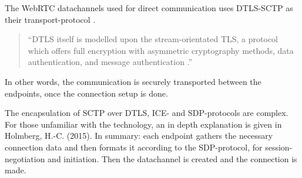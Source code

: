     The WebRTC datachannels used for direct communication uses DTLS-SCTP as their transport-protocol \cite{ar_webrtc_dc}.
    \begin{quotation}
        \enquote{DTLS itself is modelled upon the stream-orientated TLS, a protocol which offers full encryption with asymmetric cryptography methods, data authentication, and message authentication \cite{StudyWebRTCSecurity}.}
    \end{quotation}
    In other words, the communication is securely transported between the endpoints, once the connection setup is done.

    The encapsulation of SCTP over DTLS, ICE- and SDP-protocols are complex. For those unfamiliar with the technology, an in depth explanation is given in Holmberg, H.-C. (2015)\cite{url_webrtc_data}. In summary: each endpoint gathers the necessary connection data and then formats it according to the SDP-protocol, for session-negotiation and initiation. Then the datachannel is created and the connection is made.
